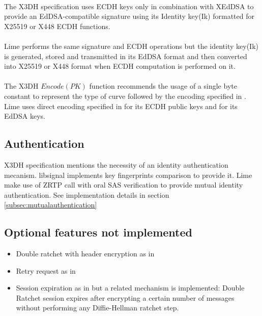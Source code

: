 \documentclass[a4paper,11pt]{article}
\begin{document}
    \paragraph{}The X3DH specification uses ECDH keys only in combination with XEdDSA\cite{xeddsa} to provide an EdDSA-compatible signature using its Identity key(Ik) formatted for X25519 or X448 ECDH functions.
    \paragraph{}Lime performs the same signature and ECDH operations but the identity key(Ik) is generated, stored and transmitted in its EdDSA format and then converted into X25519 or X448 format when ECDH computation is performed on it.
    \paragraph{}The X3DH $Encode(PK)$ function recommends the usage of a single byte constant to represent the type of curve followed by the encoding specified in \cite{rfc7748}. Lime uses direct encoding specified in \cite{rfc7748} for its ECDH public keys and \cite{rfc8032} for its EdDSA keys.

  \subsection{Authentication}
    X3DH specification mentions \cite[section 4.1]{x3dh} the necessity of an identity authentication mecanism. libsignal\cite{libsignal} implements key fingerprints comparison to provide it. Lime make use of ZRTP\cite{zrtp} call with oral SAS verification to provide mutual identity authentication. See implementation details in section \ref{subsec:mutualauthentication}
  \subsection{Optional features not implemented}
    \begin{itemize}
      \item Double ratchet with header encryption as in \cite[section 4]{doubleRatchet}
      \item Retry request as in \cite[section 4.1]{sesame}
      \item Session expiration as in \cite[section 4.2]{sesame} but a related mechanism is implemented: Double Ratchet session expires after encrypting a certain number of messages without performing any Diffie-Hellman ratchet step.
    \end{itemize}
\end{document}
